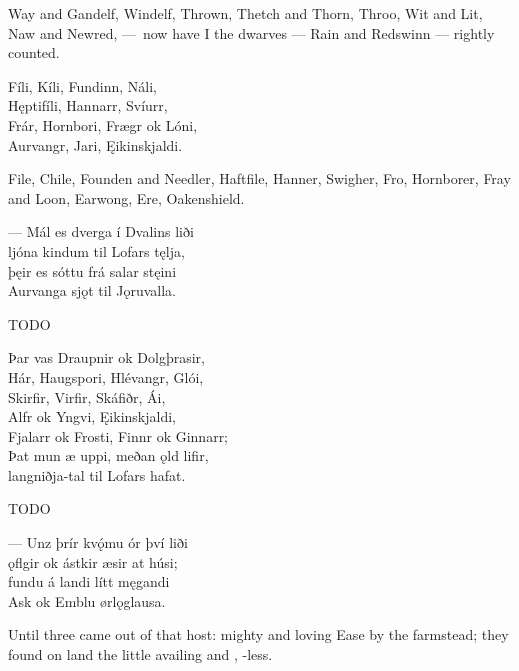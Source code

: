 \bvb Way and Gandelf, Windelf, Thrown, Thetch and Thorn, Throo, Wit and Lit, Naw and Newred, — now have I the dwarves — Rain and Redswinn — rightly counted.\evb

\bva Fíli, Kíli, \hld Fundinn, Náli, \\%
Hęptifíli, \hld Hannarr, Svíurr, \\%
Frár, Hornbori, \hld Frægr ok Lóni, \\%
Aurvangr, Jari, \hld Ęikinskjaldi.\eva

\bvb File, Chile, Founden and Needler, Haftfile, Hanner, Swigher, Fro, Hornborer, Fray and Loon, Earwong, Ere, Oakenshield.\evb

\bva — Mál es dverga \hld í Dvalins liði \\%
ljóna kindum \hld til Lofars tęlja, \\%
þęir es sóttu \hld frá salar stęini \\%
Aurvanga sjǫt \hld til Jǫruvalla.\footnotemark[1]\eva
{}

\bvb TODO\evb

\bva Þar vas Draupnir \hld ok Dolgþrasir, \\%
Hár, Haugspori, \hld Hlévangr, Glói, \\%
Skirfir, Virfir, \hld Skáfiðr, Ái, \\%
Alfr ok Yngvi, \hld Ęikinskjaldi, \\%
Fjalarr ok Frosti, \hld Finnr ok Ginnarr; \\%
Þat mun æ uppi, \hld meðan ǫld lifir, \\%
langniðja-tal \hld til Lofars hafat.\eva

\bvb TODO\evb

%

\bva — Unz þrír kvǫ́mu \hld ór því liði \\%
ǫflgir ok ástkir \hld æsir at húsi; \\%
fundu á landi \hld lítt męgandi \\%
Ask ok Emblu \hld ørlǫglausa.\eva

\bvb Until three came out of that host: mighty and loving Ease by the farmstead; they found on land the little availing  and , -less.\footnotemark[1]\evb
{}

